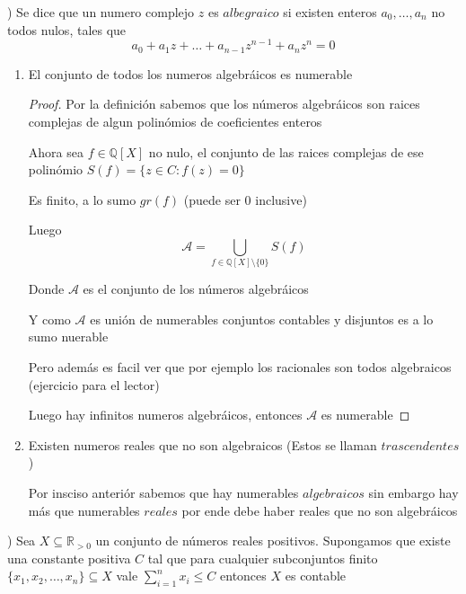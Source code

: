 \documentclass[12pt]{article}
\newcommand{\Q}{\mathbb{Q}}
\newcommand{\R}{\mathbb{R}}
\theoremstyle{definition}
\begin{document}
\newpage
{}) Se dice que un numero complejo $z$ es $albegraico$ si existen enteros $a_{0}, \dots , a_{n}$ no todos nulos, tales que $$ a_{0} + a_{1}z + \dots + a_{n-1}z^{n-1} + a_{n}z^{n} = 0$$

\begin{enumerate}
  \item El conjunto de todos los numeros algebráicos es numerable

    \begin{proof}
       Por la definición sabemos que los números algebráicos son raices complejas de algun polinómios de coeficientes enteros 
       
     Ahora sea $f \in \Q[X]$ no nulo, el conjunto de las raices complejas de ese polinómio $S(f) = \{z \in C : f(z) = 0\}$

     Es finito, a lo sumo $gr(f)$ (puede ser 0 inclusive)

     Luego $$ \mathcal{A} = \bigcup_{f \in \Q[X] \setminus \{0\}} S(f)$$

     Donde $\mathcal{A}$ es el conjunto de los números algebráicos

     Y como $\mathcal{A}$ es unión de numerables conjuntos contables y disjuntos es a lo sumo nuerable

     Pero además es facil ver que por ejemplo los racionales son todos algebraicos (ejercicio para el lector) 

     Luego hay infinitos numeros algebráicos, entonces $\mathcal{A}$ es numerable

    \end{proof}

 
  \item Existen numeros reales que no son algebraicos (Estos se llaman $trascendentes$) 

 Por insciso anteriór sabemos que hay numerables $algebraicos$ sin embargo hay más que numerables $reales$ por ende debe haber reales que no son algebráicos
\end{enumerate}

) Sea $X \subseteq \R_{ >0 }$ un conjunto de números reales positivos. Supongamos que existe una constante positiva $C$ tal que para cualquier subconjuntos finito $\{x_{1},x_{2}, \dots ,x_{n}\} \subseteq X$ vale $\sum_{i =1}^{n} x_{i} \leq C$ entonces $X$ es contable
\end{document}
